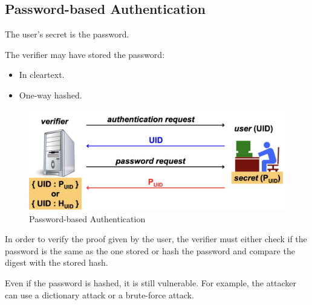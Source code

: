 \subsection{Password-based Authentication}
The user's secret is the password. 
\begin{multicols}{2}
\raggedcolumns

    The verifier may have stored the password:
    \begin{itemize}
        \item In cleartext.
        \item One-way hashed.
    \end{itemize}
\columnbreak

\begin{figure}[H]
    \centering
    \includegraphics[width=\linewidth]{Images/Authentication/pb_authn.png}
    \caption{Password-based Authentication}
\end{figure}
\end{multicols}
In order to verify the proof given by the user, the verifier must either check if the password is the same as the one stored or hash the password and compare the digest with the stored hash.

\begin{tcolorbox}[colback=red!10!white, colframe=red!70!black, coltitle=white, title=Beware]
Even if the password is hashed, it is still vulnerable. For example, the attacker can use a dictionary attack or a brute-force attack.
\end{tcolorbox}





